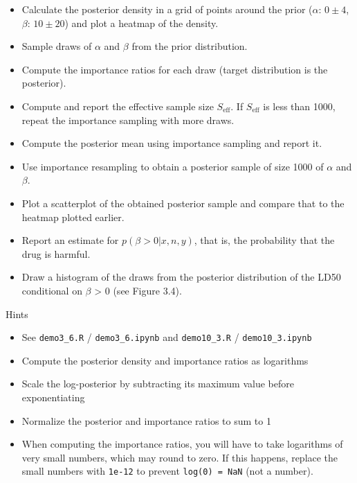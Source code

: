 \documentclass[a4paper,11pt]{article}
\begin{document}
  \begin{itemize}
  \item Calculate the posterior density in a grid of points around the prior ($\alpha$: $0 \pm 4$, $\beta$: $10 \pm 20$) and plot a heatmap of the density.
\item Sample draws of $\alpha$ and $\beta$ from the prior distribution.
\item Compute the importance ratios for each draw (target distribution is the posterior).
\item Compute and report the effective sample size $S_{\text{eff}}$. If $S_{\text{eff}}$ is less than 1000, repeat the importance sampling with more draws.
\item Compute the posterior mean using importance sampling and report it.
\item Use importance resampling to obtain a posterior sample of size 1000 of $\alpha$ and $\beta$.
\item Plot a scatterplot of the obtained posterior sample and compare that to the heatmap plotted earlier.
\item Report an estimate for $p(\beta > 0|x, n, y)$, that is, the probability that the drug is harmful.
\item Draw a histogram of the draws from the posterior distribution of the LD50 conditional on $\beta$ > 0 (see Figure 3.4).
  \end{itemize}
Hints
\begin{itemize}
\item See {\tt demo3\_6.R} / {\tt demo3\_6.ipynb} and {\tt demo10\_3.R} / {\tt demo10\_3.ipynb}
\item Compute the posterior density and importance ratios as logarithms
\item Scale the log-posterior by subtracting its maximum value before
  exponentiating
  \item Normalize the posterior and importance ratios to sum to 1
  \item When computing the importance ratios, you will have to take logarithms of very small numbers, which may round to zero. If this happens, replace the small numbers with {\tt 1e-12} to prevent {\tt log(0) = NaN} (not a number).
\end{itemize}
\end{document}
